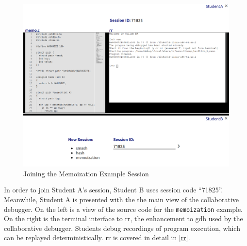\documentclass[12pt]{article}
\begin{document}
\begin{figure}[h!]

  \includegraphics[width=\textwidth]{session2i}
  \centering
  \caption{Joining the Memoization Example Session}
  \label{session2i}
\end{figure}

In order to join Student A's session, Student B uses session code
``71825''.  Meanwhile, Student A is presented with the the main view
of the collaborative debugger.  On the left is a view of the source
code for the \lstinline{memoization} example.  On the right is the
terminal interface to rr, the enhancement to gdb used by the
collaborative debugger.  Students debug recordings of program
execution, which can be replayed deterministically. rr is covered in
detail in \ref{rr}.\pagebreak
\end{document}
